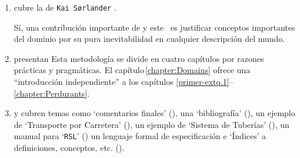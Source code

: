 \begin{enumerate}
\item {} cubre la  de
      \texttt{Kai S{\o}rlander}
      \cite{kaisorlander1994,kaisorlander1997,kaisorlander2002,kaisorlander2016,kaisorlander2022}.

      Sí, una contribución importante de \cite{BjornerMonograph2020} y
      este \primer\ es justificar conceptos importantes del dominio por
      su pura inevitabilidad en cualquier descripción del mundo.

\item {} presentan  Esta metodología se divide en cuatro capítulos por razones prácticas
    y pragmáticas. El capítulo\,\ref{chapter:Domains} ofrece una ``introducción
    independiente'' a los capítulos\,\,\ref{primer-extq.1}--\ref{chapter:Perdurants}.
  
\item {}
  y  cubren
  temas como `comentarios finales' (\sort{\ref{chapter:Closing}}), una `bibliografía' (\sort{\ref{primer.bib}}), un ejemplo de `Transporte
  por Carretera' (\sort{\ref{Chapter:Road Transport}}), un ejemplo de `Sistema de Tuberías' (\sort{\ref{appendix:Pipelines}}), un manual para `\texttt{RSL}' (\sort{\ref{RSL-intro}}) un lenguaje formal de especificación  e `Índices' a definiciones, conceptos, etc. (\sort{\ref{primer.indexes}}).
\end{enumerate}

\label{Prerequisite Skills}

